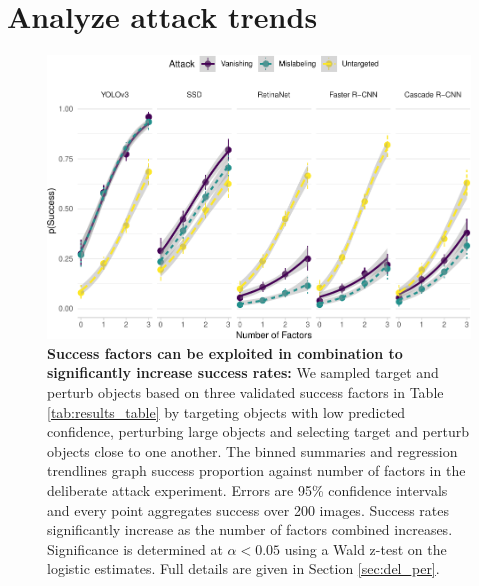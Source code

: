 \section{Analyze attack trends}\label{analyze-attack-trends}

\begin{figure}[tb]

{\centering \includegraphics[width=1\linewidth]{imgs/biased_trend_graph} 

}

\caption{\textbf{Success factors can be exploited in combination to significantly increase success rates:}  We sampled target and perturb objects based on three validated success factors in Table \ref{tab:results_table} by targeting objects with low predicted confidence, perturbing large objects and selecting target and perturb objects close to one another. The binned summaries and regression trendlines graph success proportion against number of factors in the deliberate attack experiment. Errors are 95\% confidence intervals and every point aggregates success over 200 images. Success rates significantly increase as the number of factors combined increases. Significance is determined at $\alpha < 0.05$ using a Wald z-test on the logistic estimates. Full details are given in Section \ref{sec:del_per}.}\label{fig:biased_trend_graph}
\end{figure}

\begingroup\fontsize{9}{11}\selectfont

